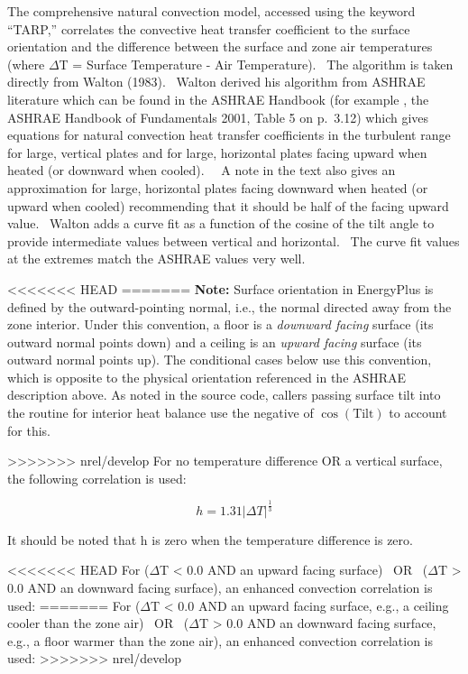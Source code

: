The comprehensive natural convection model, accessed using the keyword ``TARP,'' correlates the convective heat transfer coefficient to the surface orientation and the difference between the surface and zone air temperatures (where $\Delta$T = Surface Temperature - Air Temperature).~ The algorithm is taken directly from Walton (1983).~ Walton derived his algorithm from ASHRAE literature which can be found in the ASHRAE Handbook (for example , the  ASHRAE Handbook of Fundamentals 2001, Table 5 on p.~3.12) which gives equations for natural convection heat transfer coefficients in the turbulent range for large, vertical plates and for large, horizontal plates facing upward when heated (or downward when cooled).~~ A note in the text also gives an approximation for large, horizontal plates facing downward when heated (or upward when cooled) recommending that it should be half of the facing upward value.~ Walton adds a curve fit as a function of the cosine of the tilt angle to provide intermediate values between vertical and horizontal.~ The curve fit values at the extremes match the ASHRAE values very well.

<<<<<<< HEAD
=======
\textbf{Note:} Surface orientation in EnergyPlus is defined by the outward-pointing normal, i.e., the normal directed away from the zone interior. Under this convention, a floor is a \emph{downward facing} surface (its outward normal points down) and a ceiling is an \emph{upward facing} surface (its outward normal points up). The conditional cases below use this convention, which is opposite to the physical orientation referenced in the ASHRAE description above. As noted in the source code, callers passing surface tilt into the routine for interior heat balance use the negative of $\cos(\text{Tilt})$ to account for this.

>>>>>>> nrel/develop
For no temperature difference OR a vertical surface, the following correlation is used:

\begin{equation}
h = 1.31{\left| {\Delta T} \right|^{\frac{1}{3}}}
\end{equation}

It should be noted that h is zero when the temperature difference is zero.

<<<<<<< HEAD
For ($\Delta$T \textless{} 0.0 AND an upward facing surface)~ OR~ ($\Delta$T \textgreater{} 0.0 AND an downward facing surface), an enhanced convection correlation is used:
=======
For ($\Delta$T \textless{} 0.0 AND an upward facing surface, e.g., a ceiling cooler than the zone air)~ OR~ ($\Delta$T \textgreater{} 0.0 AND an downward facing surface, e.g., a floor warmer than the zone air), an enhanced convection correlation is used:
>>>>>>> nrel/develop

